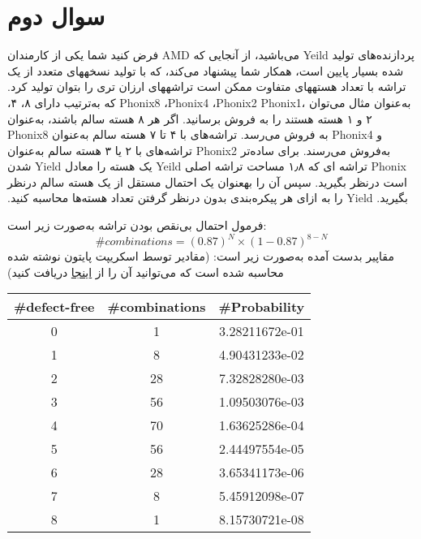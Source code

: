 \section{سوال دوم}

فرض کنید شما یکی از کارمندان AMD می‌باشید، از آنجایی که Yeild پردازنده‌های تولید شده بسیار پایین است،‌ همکار شما پیشنهاد می‌کند، که ‫با‬ ‫تولید‬ ‫نسخه‬های ‬‫متعدد‬ ‫از‬ ‫یک‬ ‫تراشه‬ ‫با‬ ‫تعداد‬ ‫هسته‬‫های ‬‫متفاوت‬ ‫ممکن‬ ‫است‬ ‫تراشه‬‫های ‬‫ارزان‬ ‫تری را بتوان تولید کرد. به‌عنوان مثال می‌توان ،Phonix8 ،Phonix4 ،Phonix2 Phonix1 که به‌ترتیب دارای ۸، ۴، ۲ و ۱ هسته هستند را به فروش برسانید.‬ اگر هر ۸ هسته سالم باشند، به‌عنوان Phonix8 به فروش می‌رسد. تراشه‌های با ۴ تا ۷ هسته سالم به‌عنوان Phonix4 و تراشه‌های با ۲ یا ۳ هسته سالم به‌عنوان Phonix2 به‌فروش می‌رسند. برای ساده‌تر شدن Yield یک هسته را معادل Yeild تراشه ای که ۱٫۸ مساحت تراشه اصلی Phonix است درنظر بگیرید. ‫سپس‬ ‫آن‬ ‫را‬ ‫به‬‫عنوان‬ یک‬ ‫احتمال مستقل از یک هسته سالم درنظر بگیرید. Yield را به ازای هر پیکره‌بندی بدون درنظر گرفتن تعداد هسته‌ها محاسبه کنید.‬
\begin{qsolve}
فرمول احتمال بی‌نقص بودن تراشه به‌صورت زیر است:
\begin{equation}
	\#combinations = (0.87)^N \times (1 - 0.87)^{8-N}
\end{equation}
مقاپیر بدست آمده به‌صورت زیر است: (مقادیر توسط اسکریپت پایتون نوشته شده محاسبه شده است که می‌توانید آن را از \href{https://github.com/rezaAdinepour/M.Sc-AUT/tree/main/Advanced%20Computer%20Architecture/HWs/Theory/HW01/Solution/Calc}{اینجا} دریافت کنید)

\begin{latin}
	\begin{center}
		\begin{tabular}{||c c c||} 
			\hline
			\#defect-free & \#combinations & \#Probability \\ [0.5ex] 
			\hline\hline
			0 & 1 & 3.28211672e-01 \\ 
			\hline
			1 & 8 & 4.90431233e-02 \\ 
			\hline
			2 & 28 & 7.32828280e-03 \\
			\hline
			3 & 56 & 1.09503076e-03 \\
			\hline
			4 & 70 & 1.63625286e-04 \\
			\hline
			5 & 56 & 2.44497554e-05 \\
			\hline
			6 & 28 & 3.65341173e-06 \\
			\hline
			7 & 8 & 5.45912098e-07 \\
			\hline
			8 & 1 & 8.15730721e-08 \\ [1ex] 
			\hline
		\end{tabular}
	\end{center}
\end{latin}


\end{qsolve}


